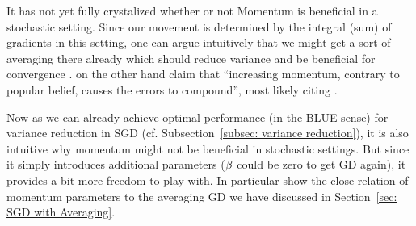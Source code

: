It has not yet fully crystalized whether or not Momentum is beneficial in a
stochastic setting. Since our movement is determined by the integral (sum) of
gradients in this setting, one can argue intuitively that we might get a sort
of averaging there already which should reduce variance and be beneficial for convergence
\parencite[e.g.][p. 69]{bottouOptimizationMethodsLargeScale2018}. \textcite{gohWhyMomentumReally2017}
on the other hand claim that ``increasing momentum, contrary to popular
belief, causes the errors to compound'', most likely citing
\textcite{devolderFirstorderMethodsSmooth2014}.

Now as we can already achieve optimal performance (in the BLUE sense) for
variance reduction in SGD (cf. Subsection~\ref{subsec: variance reduction}),
it is also intuitive why momentum might not be beneficial in stochastic settings.
But since it simply introduces additional parameters (\(\beta\) could be zero
to get GD again), it provides a bit more freedom to play with. In particular
\textcite{flammarionAveragingAccelerationThere2015} show the close relation of 
momentum parameters to the averaging GD we have discussed in Section~\ref{sec:
SGD with Averaging}.


